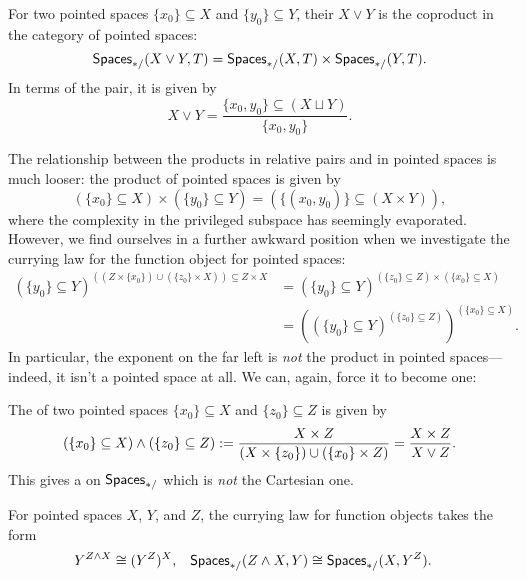 \begin{definition}
For two pointed spaces $\{x_0\} \subseteq X$ and $\{y_0\} \subseteq Y$, their  $X \vee Y$ is the coproduct in the category of pointed spaces: \[\mathsf{Spaces}_{*/}(X \vee Y, T) = \mathsf{Spaces}_{*/}(X, T) \times \mathsf{Spaces}_{*/}(Y, T).\]
In terms of the pair, it is given by \[X \vee Y = \frac{\{x_0, y_0\} \subseteq (X \sqcup Y)}{\{x_0, y_0\}}.\]
\end{definition}

The relationship between the products in relative pairs and in pointed spaces is much looser: the product of pointed spaces is given by \[(\{x_0\} \subseteq X) \times (\{y_0\} \subseteq Y) = (\{(x_0, y_0)\} \subseteq (X \times Y)),\] where the complexity in the privileged subspace has seemingly evaporated.
However, we find ourselves in a further awkward position when we investigate the currying law for the function object for pointed spaces:
\begin{align*}
(\{y_0\} \subseteq Y)^{((Z \times \{x_0\}) \cup (\{z_0\} \times X)) \subseteq Z \times X} & = (\{y_0\} \subseteq Y)^{(\{z_0\} \subseteq Z) \times (\{x_0\} \subseteq X)} \\
& = \left( (\{y_0\} \subseteq Y)^{(\{z_0\} \subseteq Z)} \right)^{(\{x_0\} \subseteq X)}.
\end{align*}
In particular, the exponent on the far left is \emph{not} the product in pointed spaces---indeed, it isn't a pointed space at all.
We can, again, force it to become one:

\begin{definition}
The  of two pointed spaces $\{x_0\} \subseteq X$ and $\{z_0\} \subseteq Z$ is given by \[(\{x_0\} \subseteq X) \wedge (\{z_0\} \subseteq Z) := \frac{X \times Z}{(X \times \{z_0\}) \cup (\{x_0\} \times Z)} = \frac{X \times Z}{X \vee Z}.\]
This gives a  on $\mathsf{Spaces}_{*/}$ which is \emph{not} the Cartesian one.
\end{definition}

\begin{corollary}
For pointed spaces $X$, $Y$, and $Z$, the currying law for function objects takes the form
\begin{align*}
Y^{Z \wedge X} & \cong (Y^Z)^X, &
\mathsf{Spaces}_{*/}(Z \wedge X, Y) & \cong \mathsf{Spaces}_{*/}(X, Y^Z).
\end{align*}
\end{corollary}

